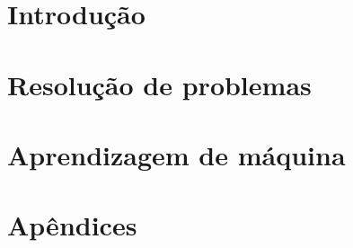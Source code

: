 \newcommand{\templatesdir}{../../templates}
\newcommand{\template}{template-notas-aula-ia}


\newcommand{\myname}{Prof. Marcelo de Souza}
\newcommand{\university}{Universidade do Estado de Santa Catarina}
\newcommand{\campus}{Centro de Educação Superior do Alto Vale do Itajaí}
\newcommand{\mytitle}{Inteligência Computacional\\Notas de Aula}
\newcommand{\version}{Versão compilada em \today.}
\newcommand{\exercisedescription}{Exercício}

\newcommand{\presentation}{Este material é utilizado nas aulas da disciplina de Inteligência Computacional (75INC) do curso de Bacharelado em Engenharia de Software da Universidade do Estado de Santa Catarina (UDESC Ibirama). Cada capítulo apresenta no seu cabeçalho uma ou mais leituras obrigatórias, que consistem nos materiais que serviram de base para o desenvolvimento do capítulo. \\ \\
\textbf{Contato:} \texttt{marcelo.desouza@udesc.br}}

\newcommand{\license}{\small Esta obra está disponível sob uma Licença \href{https://creativecommons.org/licenses/by-nc-nd/4.0}{Creative Commons (BY-NC-ND 4.0 Internacional)}.}

\newcommand{\logo}{
\begin{figure}[h]
	\centering
	\texttt{[image: \\templatesdir/\\template/img/logo-udesc.png]}
\end{figure}
}



\maketitle
\tableofcontents

\part{Introdução}



\part{Resolução de problemas}


 
\part{Aprendizagem de máquina}





\part{Apêndices}
\appendix


\nocite{*}



